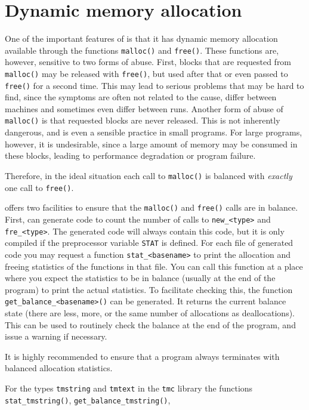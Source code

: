 \section{Dynamic memory allocation}
\label{s.allocation}
One of the important features of {\C} is that it has dynamic memory allocation
available through the functions \verb+malloc()+ and \verb+free()+.
These functions are, however, sensitive to two forms of abuse.
First,
blocks that are requested from \verb+malloc()+
may be released with \verb+free()+, but used after that or even passed to
\verb+free()+ for a second time.
This may lead to serious problems that may be hard to find,
since the symptoms are often not related to the cause, differ between machines
and sometimes even differ between runs.
Another form of abuse of \verb+malloc()+ is that requested blocks are
never released.
This is not inherently dangerous,
and is even a sensible practice in small programs.
For large programs, however, it is undesirable,
since a large amount of memory may be consumed in these blocks,
leading to performance degradation or program failure.
\par
Therefore,
in the ideal situation each call to \verb+malloc()+ is balanced with
{\em exactly} \/one call to \verb+free()+.
\par
{\Tm} offers two facilities to ensure that the \verb+malloc()+
and \verb+free()+ calls are in balance.
First,
{\Tm} can generate code to count the number of calls to \verb+new_<type>+
and \verb+fre_<type>+.
The generated {\C} code will always contain this code,
but it is only compiled if the {\C} preprocessor variable {\tt STAT}
is defined.
For each file of generated {\C} code you may request a function
\verb+stat_<basename>+ to print the allocation and freeing statistics of the
functions in that file.
You can call this function at a place where you expect the statistics
to be in balance (usually at the end of the program) to 
print the actual statistics.
To facilitate checking this, the function \verb+get_balance_<basename>()+
can be generated. It returns the current balance state (there are less, more,
or the same number of allocations as deallocations).
This can be used to routinely check the balance at the end of the program,
and issue a warning if necessary.
\par
It is highly recommended to ensure that a program always terminates
with balanced allocation statistics.
\par
For the types \verb'tmstring' and \verb'tmtext' in the \verb'tmc' library
the functions \verb+stat_tmstring()+, \verb+get_balance_tmstring()+,
